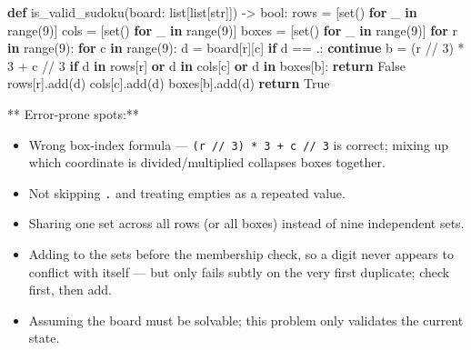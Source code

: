 \documentclass[11pt]{article}
\providecommand{\tightlist}{\setlength{\itemsep}{1pt}\setlength{\parskip}{0pt}}
\newenvironment{Shaded}{\begin{snugshade}}{\end{snugshade}}
\newcommand{\BuiltInTok}[1]{\textcolor[rgb]{0.50,0.55,0.55}{#1}}
\newcommand{\ControlFlowTok}[1]{\textcolor[rgb]{0.99,0.74,0.29}{\textbf{#1}}}
\newcommand{\DecValTok}[1]{\textcolor[rgb]{0.96,0.45,0.00}{#1}}
\newcommand{\KeywordTok}[1]{\textcolor[rgb]{0.81,0.81,0.76}{\textbf{#1}}}
\newcommand{\NormalTok}[1]{\textcolor[rgb]{0.81,0.81,0.76}{#1}}
\newcommand{\OperatorTok}[1]{\textcolor[rgb]{0.81,0.81,0.76}{#1}}
\newcommand{\StringTok}[1]{\textcolor[rgb]{0.96,0.31,0.31}{#1}}
\newcommand{\VariableTok}[1]{\textcolor[rgb]{0.15,0.68,0.68}{#1}}
\begin{document}
\begin{Shaded}
\begin{Highlighting}[]
\KeywordTok{def}\NormalTok{ is\_valid\_sudoku(board: }\BuiltInTok{list}\NormalTok{[}\BuiltInTok{list}\NormalTok{[}\BuiltInTok{str}\NormalTok{]]) }\OperatorTok{{-}\textgreater{}} \BuiltInTok{bool}\NormalTok{:}
\NormalTok{    rows }\OperatorTok{=}\NormalTok{ [}\BuiltInTok{set}\NormalTok{() }\ControlFlowTok{for}\NormalTok{ \_ }\KeywordTok{in} \BuiltInTok{range}\NormalTok{(}\DecValTok{9}\NormalTok{)]}
\NormalTok{    cols }\OperatorTok{=}\NormalTok{ [}\BuiltInTok{set}\NormalTok{() }\ControlFlowTok{for}\NormalTok{ \_ }\KeywordTok{in} \BuiltInTok{range}\NormalTok{(}\DecValTok{9}\NormalTok{)]}
\NormalTok{    boxes }\OperatorTok{=}\NormalTok{ [}\BuiltInTok{set}\NormalTok{() }\ControlFlowTok{for}\NormalTok{ \_ }\KeywordTok{in} \BuiltInTok{range}\NormalTok{(}\DecValTok{9}\NormalTok{)]}
    \ControlFlowTok{for}\NormalTok{ r }\KeywordTok{in} \BuiltInTok{range}\NormalTok{(}\DecValTok{9}\NormalTok{):}
        \ControlFlowTok{for}\NormalTok{ c }\KeywordTok{in} \BuiltInTok{range}\NormalTok{(}\DecValTok{9}\NormalTok{):}
\NormalTok{            d }\OperatorTok{=}\NormalTok{ board[r][c]}
            \ControlFlowTok{if}\NormalTok{ d }\OperatorTok{==} \StringTok{\textquotesingle{}.\textquotesingle{}}\NormalTok{:}
                \ControlFlowTok{continue}
\NormalTok{            b }\OperatorTok{=}\NormalTok{ (r }\OperatorTok{//} \DecValTok{3}\NormalTok{) }\OperatorTok{*} \DecValTok{3} \OperatorTok{+}\NormalTok{ c }\OperatorTok{//} \DecValTok{3}
            \ControlFlowTok{if}\NormalTok{ d }\KeywordTok{in}\NormalTok{ rows[r] }\KeywordTok{or}\NormalTok{ d }\KeywordTok{in}\NormalTok{ cols[c] }\KeywordTok{or}\NormalTok{ d }\KeywordTok{in}\NormalTok{ boxes[b]:}
                \ControlFlowTok{return} \VariableTok{False}
\NormalTok{            rows[r].add(d)}
\NormalTok{            cols[c].add(d)}
\NormalTok{            boxes[b].add(d)}
    \ControlFlowTok{return} \VariableTok{True}
\end{Highlighting}
\end{Shaded}

** Error-prone spots:**

\begin{itemize}
\tightlist
\item
  Wrong box-index formula --- \texttt{(r\ //\ 3)\ *\ 3\ +\ c\ //\ 3} is correct; mixing up which coordinate is divided/multiplied collapses boxes together.
\item
  Not skipping \texttt{\textquotesingle{}.\textquotesingle{}} and treating empties as a repeated value.
\item
  Sharing one set across all rows (or all boxes) instead of nine independent sets.
\item
  Adding to the sets before the membership check, so a digit never appears to conflict with itself --- but only fails subtly on the very first duplicate; check first, then add.
\item
  Assuming the board must be solvable; this problem only validates the current state.
\end{itemize}
\end{document}

